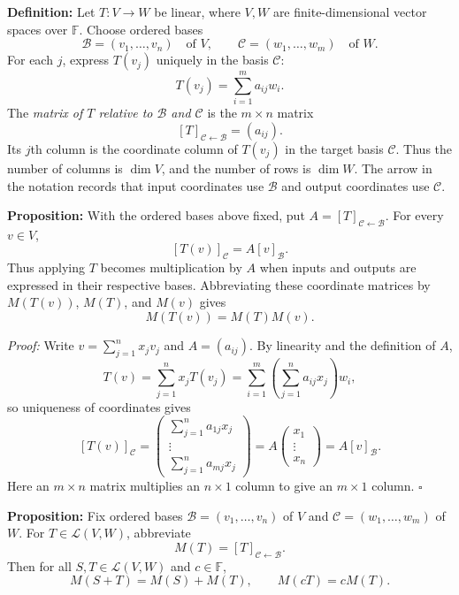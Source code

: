 \documentclass[a4paper,11pt,abstract=true]{scrartcl}
\theoremstyle{dotlessP}
\theoremstyle{dotlessS}
\theoremstyle{remark}
\theoremstyle{definition}
\begin{document}
\begin{definition_box}
\textbf{Definition:} Let
$T:V\longrightarrow W$ be linear, where $V,W$ are finite-dimensional
vector spaces over $\mathbb{F}$. Choose ordered bases
\[
\mathcal{B}=(v_1,\ldots,v_n)\quad\text{of }V,
\qquad \mathcal{C}=(w_1,\ldots,w_m)\quad\text{of }W.
\]
For each $j$, express $T(v_j)$ uniquely in the basis $\mathcal{C}$:
\[
T(v_j)=\sum_{i=1}^m a_{ij}w_i.
\]
The \emph{matrix of $T$ relative to $\mathcal{B}$ and $\mathcal{C}$} is
the $m\times n$ matrix
\[
{[T]}_{\mathcal{C}\leftarrow\mathcal{B}}=(a_{ij}).
\]
Its $j$th column is the coordinate column of $T(v_j)$ in the target
basis $\mathcal{C}$. Thus the number of columns is $\dim V$, and the
number of rows is $\dim W$. The arrow in the notation records that
input coordinates use $\mathcal{B}$ and output coordinates use
$\mathcal{C}$.
\end{definition_box}

\begin{problem_box}
\textbf{Proposition:}
With the ordered bases above fixed, put
$A={[T]}_{\mathcal{C}\leftarrow\mathcal{B}}$. For every $v\in V$,
\[
{[T(v)]}_{\mathcal{C}}
=A{[v]}_{\mathcal{B}}.
\]
Thus applying $T$ becomes multiplication by $A$ when inputs and outputs
are expressed in their respective bases. Abbreviating these coordinate
matrices by $M(T(v))$, $M(T)$, and $M(v)$ gives
\[
M(T(v))=M(T)M(v).
\]
\end{problem_box}

\begin{claim_box}
\textit{Proof:} Write $v=\sum_{j=1}^n x_j v_j$ and $A=(a_{ij})$.
By linearity and the definition of $A$,
\[
T(v)=\sum_{j=1}^n x_j T(v_j)
=\sum_{i=1}^m\left(\sum_{j=1}^n a_{ij}x_j\right)w_i,
\]
so uniqueness of coordinates gives
\[
{[T(v)]}_{\mathcal{C}}
=\begin{pmatrix}
\sum_{j=1}^n a_{1j}x_j\\
\vdots\\
\sum_{j=1}^n a_{mj}x_j
\end{pmatrix}
=A\begin{pmatrix}x_1\\\vdots\\x_n\end{pmatrix}
=A{[v]}_{\mathcal{B}}.
\]
Here an $m\times n$ matrix multiplies an $n\times1$ column to give
an $m\times1$ column. \hfill$\square$
\end{claim_box}

\begin{problem_box}
\textbf{Proposition:}
Fix ordered bases $\mathcal{B}=(v_1,\ldots,v_n)$ of $V$ and
$\mathcal{C}=(w_1,\ldots,w_m)$ of $W$. For
$T\in\mathcal{L}(V,W)$, abbreviate
\[
M(T)={[T]}_{\mathcal{C}\leftarrow\mathcal{B}}.
\]
Then for all $S,T\in\mathcal{L}(V,W)$ and $c\in\mathbb{F}$,
\[
M(S+T)=M(S)+M(T),\qquad M(cT)=cM(T).
\]

\end{problem_box}
\end{document}
